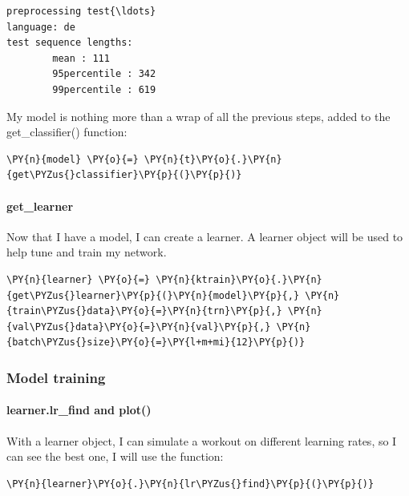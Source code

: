     \begin{Verbatim}[commandchars=\\\{\},fontsize=\footnotesize]
preprocessing test{\ldots}
language: de
test sequence lengths:
        mean : 111
        95percentile : 342
        99percentile : 619
    \end{Verbatim}
    
My model is nothing more than a wrap of all the previous steps, added to the get\_classifier() function:  
    \begin{tcolorbox}[breakable, size=fbox, boxrule=1pt, pad at break*=1mm,colback=cellbackground, colframe=cellborder]
\begin{Verbatim}[commandchars=\\\{\},fontsize=\footnotesize]
\PY{n}{model} \PY{o}{=} \PY{n}{t}\PY{o}{.}\PY{n}{get\PYZus{}classifier}\PY{p}{(}\PY{p}{)}
\end{Verbatim}
\end{tcolorbox}


\paragraph{get\_learner}
Now that I have a model, I can create a learner. A learner object will be used to help tune and train my network.
    \begin{tcolorbox}[breakable, size=fbox, boxrule=1pt, pad at break*=1mm,colback=cellbackground, colframe=cellborder]
\begin{Verbatim}[commandchars=\\\{\},fontsize=\footnotesize]
\PY{n}{learner} \PY{o}{=} \PY{n}{ktrain}\PY{o}{.}\PY{n}{get\PYZus{}learner}\PY{p}{(}\PY{n}{model}\PY{p}{,} \PY{n}{train\PYZus{}data}\PY{o}{=}\PY{n}{trn}\PY{p}{,} \PY{n}{val\PYZus{}data}\PY{o}{=}\PY{n}{val}\PY{p}{,} \PY{n}{batch\PYZus{}size}\PY{o}{=}\PY{l+m+mi}{12}\PY{p}{)}
\end{Verbatim}
\end{tcolorbox}
\subsubsection{Model training}
\label{chap:model training}
\paragraph{learner.lr\_find and plot()}
With a learner object, I can simulate a workout on different learning rates, so I can see the best one, I will use the function:
    \begin{tcolorbox}[breakable, size=fbox, boxrule=1pt, pad at break*=1mm,colback=cellbackground, colframe=cellborder]
\begin{Verbatim}[commandchars=\\\{\},fontsize=\footnotesize]
\PY{n}{learner}\PY{o}{.}\PY{n}{lr\PYZus{}find}\PY{p}{(}\PY{p}{)}
\end{Verbatim}
\end{tcolorbox}


